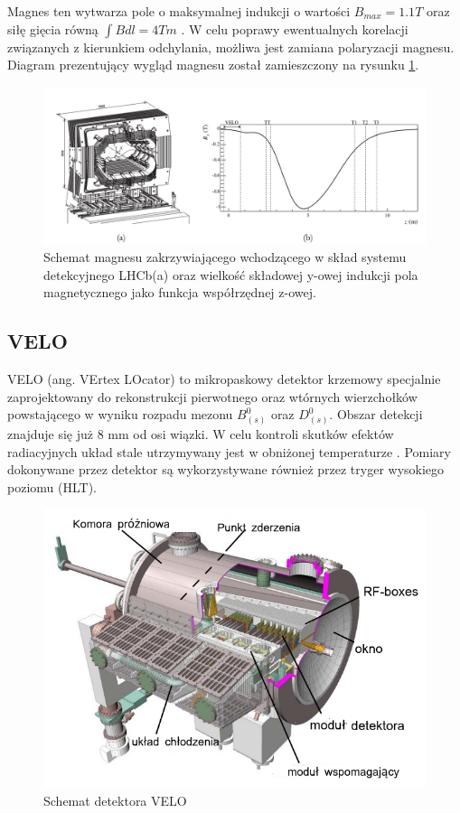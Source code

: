Magnes ten wytwarza pole o maksymalnej indukcji o wartości $B_{max}=1.1T$ oraz siłę gięcia równą $\int B dl=4Tm$ \cite{magnet}. W celu poprawy ewentualnych korelacji związanych z kierunkiem odchylania, możliwa jest zamiana polaryzacji magnesu. Diagram prezentujący wygląd magnesu został zamieszczony na rysunku \ref{fig:magnes}.
\begin{figure}[!ht]
 \centering
 \includegraphics[scale=0.35]{rozdzial2/magnes.png}
 \caption{Schemat magnesu zakrzywiającego wchodzącego w skład systemu detekcyjnego LHCb(a) oraz wielkość składowej y-owej indukcji pola magnetycznego jako funkcja współrzędnej z-owej.  }
 \label{fig:magnes}
\end{figure}

 


\subsection{VELO}
\label{VELO}

VELO (ang. VErtex LOcator) to mikropaskowy detektor krzemowy specjalnie zaprojektowany do rekonstrukcji pierwotnego oraz wtórnych wierzchołków powstającego w wyniku rozpadu mezonu $B_{(s)}^0$ oraz $D_{(s)}^0$\cite{VELORaport}. Obszar detekcji znajduje się już 8 mm od osi wiązki. W celu kontroli skutków efektów radiacyjnych układ stale utrzymywany jest w obniżonej temperaturze \cite{Papadelis} . Pomiary dokonywane przez detektor są wykorzystywane również przez tryger wysokiego poziomu (HLT). 
\begin{figure}[!ht]
 \centering
 \includegraphics[scale=0.7]{rozdzial2/Velo_jakis.png}
 \caption{Schemat detektora VELO\cite{VELORaport}}
 \label{fig:SchematVELO}
\end{figure}
